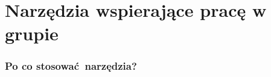 \section{Narzędzia wspierające pracę w grupie}
\label{narzedzia}


\begin{frame}
    \frametitle{Po co stosować narzędzia?}

    

\end{frame}